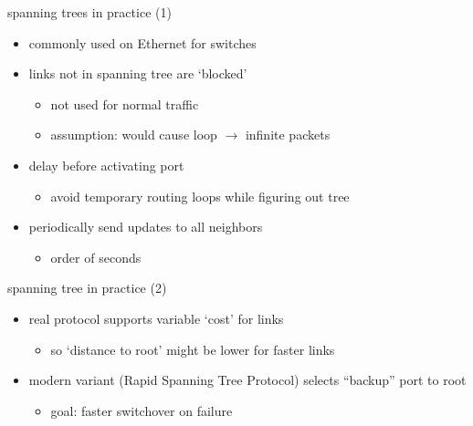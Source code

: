 \begin{frame}{spanning trees in practice (1)}
    \begin{itemize}
    \item commonly used on Ethernet for switches
    \item links not in spanning tree are `blocked'
        \begin{itemize}
        \item not used for normal traffic
        \item assumption: would cause loop $\rightarrow$ infinite packets
        \end{itemize}
    \item delay before activating port
        \begin{itemize}
        \item avoid temporary routing loops while figuring out tree
        \end{itemize}
    \item periodically send updates to all neighbors
        \begin{itemize}
        \item order of seconds
        \end{itemize}
    \end{itemize}
\end{frame}

\begin{frame}{spanning tree in practice (2)}
    \begin{itemize}
    \item real protocol supports variable `cost' for links
        \begin{itemize}
        \item so `distance to root' might be lower for faster links
        \end{itemize}
    \item modern variant (Rapid Spanning Tree Protocol) selects ``backup'' port to root 
        \begin{itemize}
        \item goal: faster switchover on failure
        \end{itemize}
    \end{itemize}
\end{frame}
